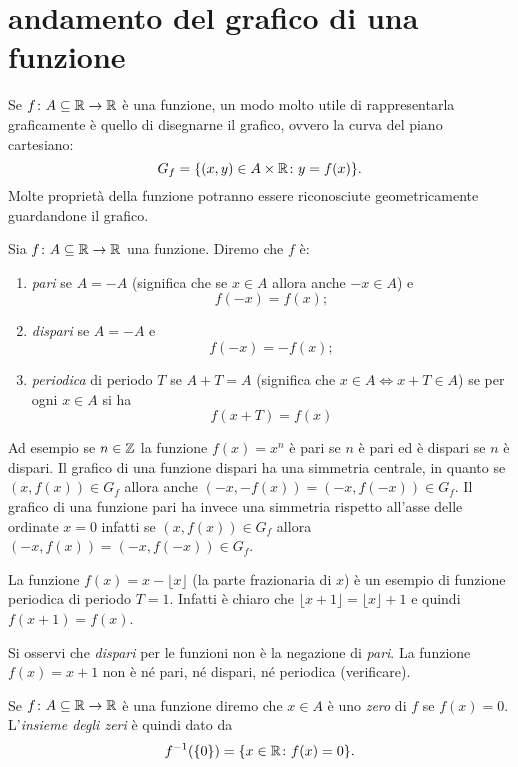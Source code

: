 \section{andamento del grafico di una funzione}
%
Se $f\colon A \subseteq {\mathbb R}\to {\mathbb R}$ è una funzione, un modo molto
utile di rappresentarla graficamente è quello di disegnarne il
grafico, ovvero la curva del piano cartesiano:
\[
   G_f = {\left\{ (x,y)\in A\times {\mathbb R}\colon y = f(x) \right\}}.
\]
Molte proprietà della funzione potranno essere riconosciute
geometricamente guardandone il grafico.

\begin{definition}[simmetrie]
Sia $f\colon A \subseteq {\mathbb R} \to {\mathbb R}$ una funzione.
Diremo che $f$ è:
\begin{enumerate}
\item \emph{pari}%
%
%
se $A=-A$ (significa che se $x\in A$ allora anche $-x\in A$) e
\[
  f(-x) = f(x);
\]
\item \emph{dispari}%
%
%
se $A=-A$ e
\[
  f(-x) = -f(x);
\]
\item \emph{periodica}%
%
%
di periodo $T$ se $A+T=A$
(significa che $x\in A \iff x+T \in A$)
se per ogni $x\in A$ si ha
\[
  f(x+T)=f(x)
\]
\end{enumerate}
\end{definition}

Ad esempio se $n\in {\mathbb Z}$ la funzione $f(x)=x^n$
è pari se $n$ è pari ed è dispari se $n$ è dispari.
Il grafico di una funzione dispari ha una simmetria
centrale, in quanto se $(x,f(x))\in G_f$ allora
anche $(-x,-f(x)) = (-x,f(-x))\in G_f$.
Il grafico di una funzione pari ha invece una
simmetria rispetto all'asse delle ordinate $x=0$
infatti se $(x,f(x))\in G_f$ allora $(-x,f(x)) = (-x,f(-x)) \in G_f$.

La funzione $f(x) = x - \lfloor x\rfloor$ (la parte frazionaria di $x$)
è un esempio di funzione periodica di periodo $T=1$. Infatti
è chiaro che $\lfloor x+1\rfloor = \lfloor x \rfloor +1$ e quindi
$f(x+1)=f(x)$.

Si osservi che \emph{dispari} per le funzioni non è la negazione
di \emph{pari}.
La funzione $f(x) = x+1$ non è né pari, né dispari, né periodica
(verificare).

\begin{definition}[zeri]
  Se $f\colon A\subseteq {\mathbb R} \to {\mathbb R}$ è una funzione diremo che
  $x\in A$ è uno \emph{zero} di $f$ se $f(x)=0$.
  L'\emph{insieme degli zeri}%
%
  è quindi dato da
  \[
    f^{-1}({\left\{ 0 \right\}}) = {\left\{ x\in {\mathbb R}\colon f(x) = 0 \right\}}.
  \]
\end{definition}

